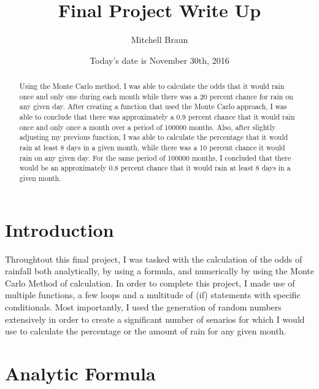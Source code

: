\documentclass[onecolumn]{revtex4}
\begin{document}
\title{
Final Project Write Up
}

\author{Mitchell Braun}


\date {Today's date is November 30th, 2016}


\begin{abstract}

	Using the Monte Carlo method, I was able to calculate the odds that it would rain once and only one during each month while there was a 20 percent chance for rain on any given day. After creating a function that used the Monte Carlo approach, I was able to conclude that there was approximately a 0.9 percent chance that it would rain once and only once a month over a period of 100000 months. Also, after slightly adjusting my previous function, I was able to calculate the percentage that it would rain at least 8 days in a given month, while there was a 10 percent chance it would rain on any given day. For the same period of 100000 months, I concluded that there would be an approximately 0.8 percent chance that it would rain at least 8 days in a given month. 

\end{abstract}

\maketitle

\section{Introduction}


	Throughtout this final project, I was tasked with the calculation of the odds of rainfall both analytically, by using a formula, and numerically by using the Monte Carlo Method of calculation. In order to complete this project, I made use of multiple functions, a few loops and a multitude of (if) statements with specific conditionals. Most importantly, I used the generation of random numbers extensively in order to create a significant number of senarios for which I would use to calculate the percentage or the amount of rain for any given month.

	


\section{Analytic Formula}
\end{document}
